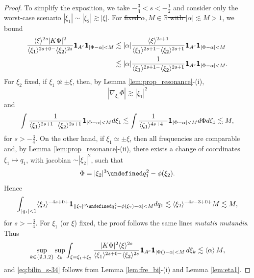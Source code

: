 \documentclass[a4paper,
11pt,  reqno]{amsart}
\makeatletter
\newcommand{\mathbbm}[1]{\mathchoice%
    {\hbox{\sffamily 1\kern-.40em 1}}%
    {\hbox{\sffamily 1\kern-.40em 1}}%
    {\hbox{\scriptsize\sffamily 1\kern-.30em 1}}%
    {\hbox{\tiny\sffamily 1\kern-.25em 1}}}%
\newcommand{\jap}[1]{\langle #1 \rangle}
\newcommand{\5}{\textup{V}}
\newcommand{\ind}{\mathbbm 1}
\theoremstyle{remark}
\newcommand{\R}{\mathbb{R}}
\let\Re=\undefined\DeclareMathOperator*{\Re}{Re}
\renewcommand{\l}{\ell}
\def\<#1>{\csname MH@symb@#1\endcsname}
\numberwithin{equation}{section}
\numberwithin{theorem}{section}
\providecommand{\DIFaddtex}[1]{{\protect\color{blue}\uwave{#1}}} %
\providecommand{\DIFdeltex}[1]{{\protect\color{red}\sout{#1}}}                      %
\providecommand{\DIFaddbegin}{} %
\providecommand{\DIFaddend}{} %
\providecommand{\DIFdelbegin}{} %
\providecommand{\DIFdelend}{} %
\providecommand{\DIFadd}[1]{\texorpdfstring{\DIFaddtex{#1}}{#1}} %
\providecommand{\DIFdel}[1]{\texorpdfstring{\DIFdeltex{#1}}{}} %
\makeatother
\begin{document}
\begin{proof}
To simplify the exposition, we take $-\frac{3}{4}<s<-\frac{1}{2}$ and consider only the worst-case scenario $|\xi_1|\sim |\xi_2|\gtrsim |\xi|$. For \DIFdelbegin \DIFdel{fixed $\alpha, M\in \R$ with $|\alpha|\lesssim M>1$}\DIFdelend \DIFaddbegin \DIFadd{$\alpha\in\R$ and $M>1$ with $|\alpha|\lesssim M$}\DIFaddend , we bound
\begin{align}
\frac{\jap{\xi}^{2s}|K\Phi|^2}{\jap{\xi_1}^{2s+0-}\jap{\xi_2}^{2s}}\mathbbm{1}_{A^c}\ind_{|\Phi-\alpha|<M}&\lesssim |\alpha|\frac{\jap{\xi}^{2s+1}}{\jap{\xi_1}^{2s+1-}\jap{\xi_2}^{2s+1}}\mathbbm{1}_{A^c}\ind_{|\Phi-\alpha|<M}\\&\lesssim |\alpha|\frac{1}{\jap{\xi_1}^{2s+1-}\jap{\xi_2}^{2s+1}}\mathbbm{1}_{A^c}\ind_{|\Phi-\alpha|<M}.
\end{align}
For $\xi_2$ fixed, if $\xi_1\not\simeq \pm\xi$, then, by Lemma \ref{lem:prop_resonance}-(i),
$$
|\nabla_{\xi_1}\Phi|\gtrsim |\xi_1|^2
$$
and
\begin{align}
\int \frac{1}{\jap{\xi_1}^{2s+1-}\jap{\xi_2}^{2s+1}}\ind_{|\Phi-\alpha|<M}d\xi_1 \lesssim \int \frac{1}{\jap{\zeta_1}^{4s+4-}}\ind_{|\Phi-\alpha|<M}d\Phi d\zeta_1 \lesssim M,
\end{align}
for $s>-\frac{3}{4}$. On the other hand, if $\xi_1\simeq \pm \xi$, then all frequencies are comparable and, by Lemma \ref{lem:prop_resonance}-(ii), there exists a change of coordinates $\xi_1\mapsto q_1$, with jacobian $\sim |\xi_2|^2$, such that
$$
\Phi=|\xi_2|^3\Re q_1^2-\phi(\xi_2).
$$
Hence
\begin{align*}
\int_{|q_1|<1} \jap{\xi_2}^{-4s+0+}\ind_{||\xi_2|^3\Re q_1^2-\phi(\xi_2)-\alpha|<M}dq_1 \lesssim \jap{\xi_2}^{-4s-3+0+}M\lesssim M,
\end{align*}
for $s>-\frac{3}{4}$.
\smallskip
For $\xi_1$ (or $\xi$) fixed, the proof follows the same lines \textit{mutatis mutandis}. Thus
\DIFdelbegin %
\DIFdelend \DIFaddbegin \begin{equation}\label{eq:final_appendix}
\sup_{k\in\{\emptyset, 1, 2\}}\sup_{\xi_k}\int_{\xi=\xi_1+\xi_2}
        \frac{|K\Phi|^2\jap{\xi}^{2s}}{\jap{\xi_{1}}^{2s+0-}\jap{\xi_{2}}^{2s}}\ind_{A^c}\mathbbm{1}_{|\Phi(\<1>)-\alpha|<M}\, d\xi_{k} \lesssim \jap{\alpha}\,M,
    \end{equation}\DIFaddend 
and \eqref{eq:bilin_s-34} follows from Lemma \ref{lem:fre_bi}-(i) and Lemma \ref{lem:eta1}.
\end{proof}
\end{document}
